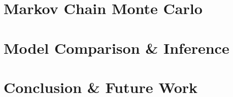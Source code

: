 \documentclass[handout]{beamer}
\begin{document}
\section{Markov Chain Monte Carlo}


%
%


\section{Model Comparison \& Inference}


%
%


\section{Conclusion \& Future Work}
\end{document}
